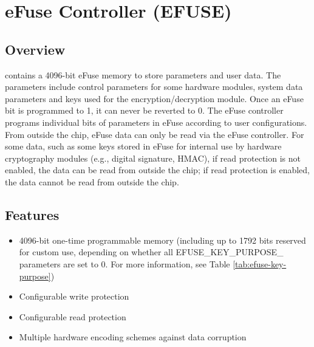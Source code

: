 \documentclass[main\_\_EN.tex]{subfiles}
\begin{document}

\ifglobal
\else
    {\let\clearpage\relax \listoftodos}
    {\let\clearpage\relax \listofdonetodos}
    \tableofcontents
\fi



\hypertarget{efuse}{}
\section{eFuse Controller (EFUSE)}
\label{mod:efuse}

\subsection{Overview}

\chipname{} contains a 4096-bit eFuse memory to store parameters and user data. The parameters include control parameters for some hardware modules, system data parameters and keys used for the encryption/decryption module. Once an eFuse bit is programmed to 1, it can never be reverted to 0. The eFuse controller programs individual bits of parameters in eFuse according to user configurations. From outside the chip, eFuse data can only be read via the eFuse controller. For some data, such as some keys stored in eFuse for internal use by hardware cryptography modules (e.g., digital signature, HMAC), if read protection is not enabled, the data can be read from outside the chip; if read protection is enabled, the data cannot be read from outside the chip.


\subsection{Features}

\begin{itemize}
    \item 4096-bit one-time programmable memory (including up to 1792 bits reserved for custom use, depending on whether all EFUSE\_KEY\_PURPOSE\_ parameters are set to 0. For more information, see Table \ref{tab:efuse-key-purpose})
    \item Configurable write protection
    \item Configurable read protection
    \item Multiple hardware encoding schemes against data corruption
\end{itemize}
\end{document}

